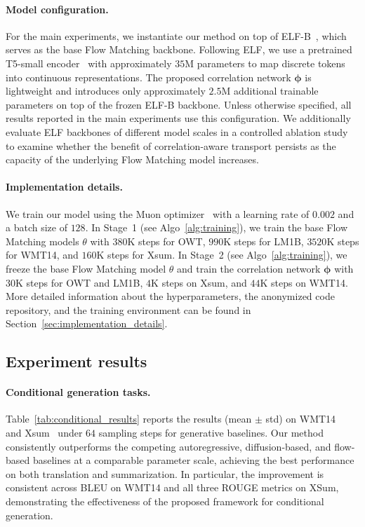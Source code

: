 \documentclass{article} %
\begin{document}
\paragraph{Model configuration.}
For the main experiments, we instantiate our method on top of ELF-B~\citep{hu2026elf}, which serves as the base Flow Matching backbone. Following ELF, we use a pretrained T5-small encoder~\citep{raffel2023exploringlimitstransferlearning} with approximately $35$M parameters to map discrete tokens into continuous representations. The proposed correlation network $\boldsymbol{\phi}$ is lightweight and introduces only approximately $2.5$M additional trainable parameters on top of the frozen ELF-B backbone. Unless otherwise specified, all results reported in the main experiments use this configuration. We additionally evaluate ELF backbones of different model scales in a controlled ablation study to examine whether the benefit of correlation-aware transport persists as the capacity of the underlying Flow Matching model increases.

\paragraph{Implementation details.} We train our model using the Muon optimizer~\citep{jordan2024muon} with a learning rate of $0.002$ and a batch size of $128$. In Stage~1 (see Algo~\ref{alg:training}), we train the base Flow Matching models $\theta$  with $380$K steps for OWT, $990$K steps for LM1B, $3520$K steps for WMT14, and $160$K steps for Xsum. In Stage~2 (see Algo~\ref{alg:training}), we freeze the base Flow Matching model $\theta$ and train the correlation network $\boldsymbol{\phi}$ with $30$K steps for OWT and LM1B, $4$K steps on Xsum, and $44$K steps on WMT14. More detailed information about the hyperparameters, the anonymized code repository, and the training environment can be found in Section~\ref{sec:implementation_details}.



\subsection{Experiment results}
\label{sec:exp_results}

\paragraph{Conditional generation tasks.}
Table~\ref{tab:conditional_results} reports the results (mean $\pm$ std) on WMT14~\citep{bojar-etal-2014-findings} and Xsum~\citep{narayan2018dontdetailsjustsummary} under $64$ sampling steps for generative baselines. Our method consistently outperforms the competing autoregressive, diffusion-based, and flow-based baselines at a comparable parameter scale, achieving the best performance on both translation and summarization. In particular, the improvement is consistent across BLEU on WMT14 and all three ROUGE metrics on XSum, demonstrating the effectiveness of the proposed framework for conditional generation.
\end{document}
